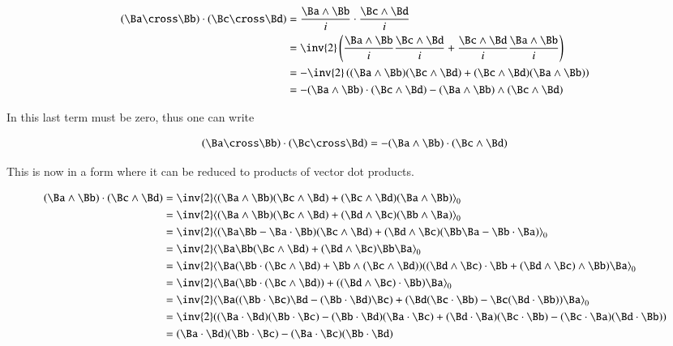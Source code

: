 \begin{align*}
( \Ba \cross \Bb ) \cdot ( \Bc \cross \Bd )
&= \frac{\Ba \wedge \Bb}{i} \cdot \frac{\Bc \wedge \Bd}{i} \\
&= \inv{2}\left( \frac{\Ba \wedge \Bb}{i} \frac{\Bc \wedge \Bd}{i} + \frac{\Bc \wedge \Bd}{i} \frac{\Ba \wedge \Bb}{i} \right) \\
&= -\inv{2}\left( (\Ba \wedge \Bb) (\Bc \wedge \Bd) + (\Bc \wedge \Bd) (\Ba \wedge \Bb) \right) \\
&= - (\Ba \wedge \Bb) \cdot (\Bc \wedge \Bd) - (\Ba \wedge \Bb) \wedge (\Bc \wedge \Bd)
\end{align*}

In  this last term must be zero, thus one can write

\begin{align}\label{eqn:bivector:boo1}
( \Ba \cross \Bb ) \cdot ( \Bc \cross \Bd ) = -(\Ba \wedge \Bb) \cdot (\Bc \wedge \Bd)
\end{align}

This is now in a form where it can be reduced to products of vector dot products.

\begin{align*}
(\Ba \wedge \Bb) \cdot (\Bc \wedge \Bd)
&= \inv{2}\gpgradezero{ (\Ba \wedge \Bb) (\Bc \wedge \Bd) + (\Bc \wedge \Bd) (\Ba \wedge \Bb) } \\
&= \inv{2}\gpgradezero{ (\Ba \wedge \Bb) (\Bc \wedge \Bd) + (\Bd \wedge \Bc) (\Bb \wedge \Ba) } \\
&= \inv{2}\gpgradezero{ (\Ba\Bb - \Ba \cdot \Bb ) (\Bc \wedge \Bd) + (\Bd \wedge \Bc) (\Bb \Ba - \Bb \cdot \Ba ) } \\
&= \inv{2}\gpgradezero{ \Ba\Bb (\Bc \wedge \Bd) + (\Bd \wedge \Bc) \Bb \Ba } \\
&= \inv{2}\gpgradezero{ \Ba (\Bb \cdot (\Bc \wedge \Bd) + \Bb \wedge (\Bc \wedge \Bd)) ( (\Bd \wedge \Bc) \cdot \Bb + (\Bd \wedge \Bc) \wedge \Bb) \Ba } \\
&= \inv{2}\gpgradezero{ \Ba (\Bb \cdot (\Bc \wedge \Bd)) + ( (\Bd \wedge \Bc) \cdot \Bb ) \Ba } \\
&= \inv{2}\gpgradezero{ \Ba ( (\Bb \cdot \Bc) \Bd - (\Bb \cdot \Bd) \Bc ) + ( \Bd (\Bc \cdot \Bb) - \Bc (\Bd \cdot \Bb) ) \Ba } \\
&= \inv{2}( ( \Ba \cdot \Bd ) ( \Bb \cdot \Bc ) - ( \Bb \cdot \Bd ) ( \Ba \cdot \Bc ) + ( \Bd \cdot \Ba ) ( \Bc \cdot \Bb ) - ( \Bc \cdot \Ba ) ( \Bd \cdot \Bb ) ) \\
&= ( \Ba \cdot \Bd ) ( \Bb \cdot \Bc ) - ( \Ba \cdot \Bc ) ( \Bb \cdot \Bd ) \\
\end{align*}

